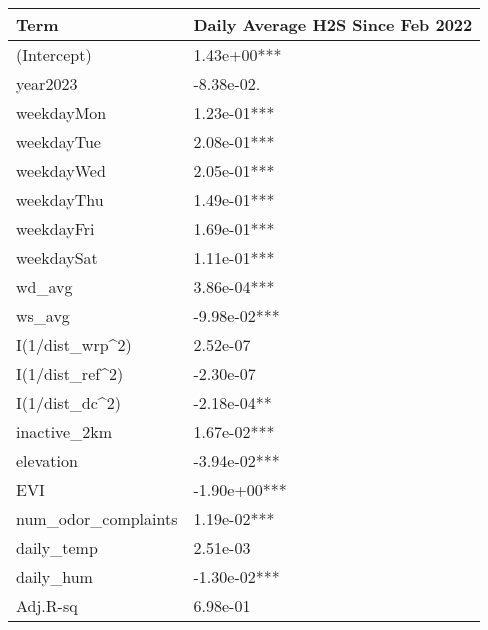
\begin{tabular}{l|l}
\hline
Term & Daily Average H2S Since Feb 2022\\
\hline
(Intercept) & 1.43e+00***\\
\hline
year2023 & -8.38e-02.\\
\hline
weekdayMon & 1.23e-01***\\
\hline
weekdayTue & 2.08e-01***\\
\hline
weekdayWed & 2.05e-01***\\
\hline
weekdayThu & 1.49e-01***\\
\hline
weekdayFri & 1.69e-01***\\
\hline
weekdaySat & 1.11e-01***\\
\hline
wd\_avg & 3.86e-04***\\
\hline
ws\_avg & -9.98e-02***\\
\hline
I(1/dist\_wrp\textasciicircum{}2) & 2.52e-07\\
\hline
I(1/dist\_ref\textasciicircum{}2) & -2.30e-07\\
\hline
I(1/dist\_dc\textasciicircum{}2) & -2.18e-04**\\
\hline
inactive\_2km & 1.67e-02***\\
\hline
elevation & -3.94e-02***\\
\hline
EVI & -1.90e+00***\\
\hline
num\_odor\_complaints & 1.19e-02***\\
\hline
daily\_temp & 2.51e-03\\
\hline
daily\_hum & -1.30e-02***\\
\hline
Adj.R-sq & 6.98e-01\\
\hline
\end{tabular}
